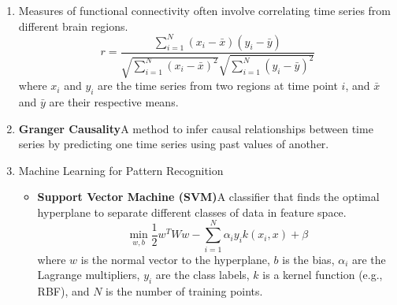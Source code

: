 \documentclass[twocolumn]{article}
\begin{document}
\begin{enumerate}
\item Measures of functional connectivity often involve correlating
time series from different brain regions.
\[ r = \frac{\sum_{i=1}^{N}(x_i - \bar{x})(y_i - \bar{y})}{\sqrt{\sum_{i=1}^{N}(x_i -
\bar{x})^2}\sqrt{\sum_{i=1}^{N}(y_i - \bar{y})^2}} \]
where \( x_i \) and \( y_i \) are the time series from two regions at time point \( i \), and \( \bar{x} \) and \(
\bar{y} \) are their respective means.

\item \textbf{Granger Causality}A method to infer causal relationships between time series by predicting one
time series using past values of another.
\item Machine Learning for Pattern Recognition

\begin{itemize}
\item \textbf{Support Vector Machine (SVM)}A classifier that finds the optimal hyperplane to separate different
classes of data in feature space.
\[ \min_{w,b} \frac{1}{2}w^TWw - \sum_{i=1}^{N}\alpha_i y_i k(x_i, x) + \beta \]
where \( w \) is the normal vector to the hyperplane, \( b \) is the bias, \( \alpha_i \) are the Lagrange multipliers, \( y_i \) are the class labels, \( k \) is a kernel function (e.g., RBF), and \( N \) is the number of training points.
\end{itemize}
\end{enumerate}
\begin{comment}
\subsection{Convolutional Neural Networks (CNN)}
A deep learning architecture designed to process data with a grid-like topology (such as images or voxels in 3D brain scans).

\subsection{Multivariate Analysis of Variance (MANOVA)}
A statistical method that can test for differences
between groups across multiple variables simultaneously.
\[ F = \frac{\left|\mathbf{A}\right|}{\sigma^2} \cdot \frac{\Delta\mathbf{y}}{\mathbf{y}} \]
where \( \mathbf{A} \) is the between-group scatter matrix, \( \sigma^2 \) is the error mean square, \( \Delta\mathbf{y} \) is the difference between group vectors, and \( \mathbf{y} \) is the pooled vector.
These equations are just a starting point for the complex analyses involved in studying brain structure and function. The specific equations used can vary depending on the software tools (e.g., FSL, SPM, DTIStudio, etc.) and the particular research question being addressed. Additionally, the integration of these data types often requires sophisticated statistical methods to account for multiple comparisons and the complex interplay between structure and function.
\end{comment}
\end{document}
